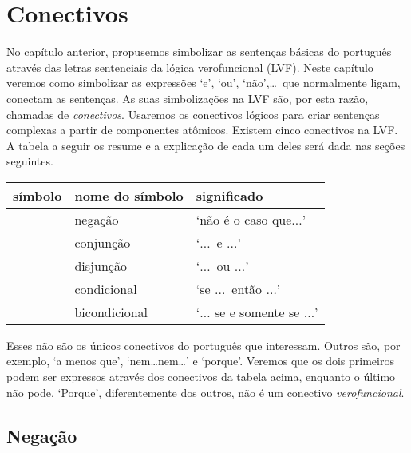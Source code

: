 \chapter{Conectivos}
\label{s:TFLConnectives}

No capítulo anterior, propusemos simbolizar as sentenças básicas do português através das letras sentenciais da lógica verofuncional (LVF).
Neste capítulo veremos como simbolizar as expressões `e', `ou', `não',\ldots\ 
que normalmente ligam, conectam as sentenças.
As suas simbolizações na LVF são, por esta razão, chamadas de \emph{conectivos}.
Usaremos os conectivos lógicos para criar sentenças complexas a partir de componentes atômicos. Existem cinco conectivos na LVF.
A tabela a seguir os resume e a explicação de cada um deles será dada nas seções seguintes.

	\begin{table}[h]
	\center
	\begin{tabular}{l l l}
	
	\textbf{símbolo}&\textbf{nome do símbolo}&\textbf{significado}\\
	\hline
	\enot&negação&`não é o caso que$\ldots$'\\
	\eand&conjunção&`$\ldots$\ e $\ldots$'\\
	\eor&disjunção&`$\ldots$\ ou $\ldots$'\\
	\eif&condicional&`se $\ldots$\ então $\ldots$'\\
	\eiff&bicondicional&`$\ldots$ se e somente se $\ldots$'\\
	
	\end{tabular}
	\end{table}

Esses não são os únicos conectivos do português que interessam.
Outros são, por exemplo, `a menos que', `nem\ldots{}nem\ldots' e `porque'.
Veremos que os dois primeiros podem ser expressos através dos conectivos da tabela acima, enquanto o último não pode.
`Porque', diferentemente dos outros, não é um conectivo \emph{verofuncional}.
        
\section{Negação}

